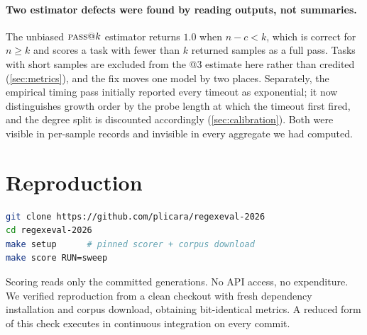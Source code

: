 \documentclass[11pt]{article}
\newcommand{\pass}{\textsc{pass}}
\begin{document}
\paragraph{Two estimator defects were found by reading outputs, not
summaries.} The unbiased $\pass{}@k$ estimator \citep{chen2021codex}
returns $1.0$ when $n - c < k$, which is correct for $n \geq k$ and scores a
task with fewer than $k$ returned samples as a full pass. Tasks with short
samples are excluded from the @3 estimate here rather than credited
(\cref{sec:metrics}), and the fix moves one model by two places. Separately,
the empirical timing pass initially reported every timeout as exponential;
it now distinguishes growth order by the probe length at which the timeout
first fired, and the degree split is discounted accordingly
(\cref{sec:calibration}). Both were visible in per-sample records and
invisible in every aggregate we had computed.

\section{Reproduction}

\begin{lstlisting}[language=bash]
git clone https://github.com/plicara/regexeval-2026
cd regexeval-2026
make setup      # pinned scorer + corpus download
make score RUN=sweep
\end{lstlisting}

Scoring reads only the committed generations. No API access, no
expenditure. We verified reproduction from a clean checkout with fresh
dependency installation and corpus download, obtaining bit-identical metrics.
A reduced form of this check executes in continuous integration on every
commit.
\end{document}
